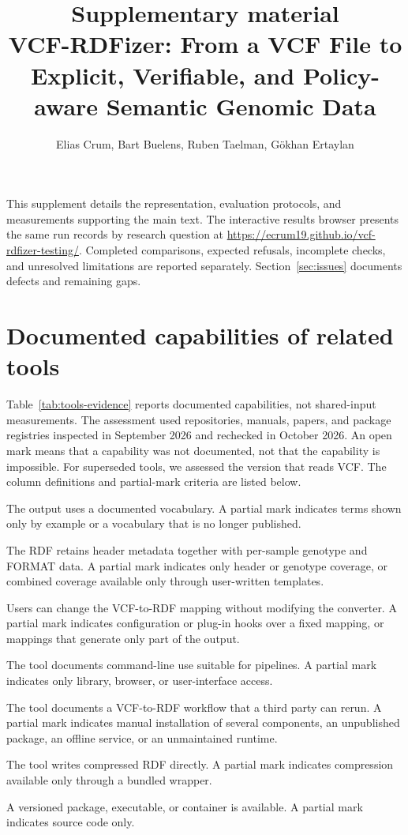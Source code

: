 \documentclass[11pt]{article}
\title{Supplementary material\\[4pt]\large VCF-RDFizer: From a VCF File to Explicit, Verifiable, and Policy-aware Semantic Genomic Data}
\author{Elias Crum, Bart Buelens, Ruben Taelman, G\"okhan Ertaylan}
\date{}
\begin{document}
\maketitle
\noindent This supplement details the representation, evaluation protocols, and measurements supporting the main text.
The interactive results browser presents the same run records by research question at \url{https://ecrum19.github.io/vcf-rdfizer-testing/}.
Completed comparisons, expected refusals, incomplete checks, and unresolved limitations are reported separately.
Section~\ref{sec:issues} documents defects and remaining gaps.
{\small\setlength{\parskip}{0pt}\tableofcontents}
\clearpage

\section{Documented capabilities of related tools}\label{sec:tools}
Table~\ref{tab:tools-evidence} reports documented capabilities, not shared-input measurements.
The assessment used repositories, manuals, papers, and package registries inspected in September 2026 and rechecked in October 2026.
An open mark means that a capability was not documented, not that the capability is impossible.
For superseded tools, we assessed the version that reads VCF.
The column definitions and partial-mark criteria are listed below.
\begin{description}\setlength{\itemsep}{1pt}
\item[RDF model] The output uses a documented vocabulary.
A partial mark indicates terms shown only by example or a vocabulary that is no longer published.
\item[Header + genotype] The RDF retains header metadata together with per-sample genotype and FORMAT data.
A partial mark indicates only header or genotype coverage, or combined coverage available only through user-written templates.
\item[Editable mappings] Users can change the VCF-to-RDF mapping without modifying the converter.
A partial mark indicates configuration or plug-in hooks over a fixed mapping, or mappings that generate only part of the output.
\item[CLI] The tool documents command-line use suitable for pipelines.
A partial mark indicates only library, browser, or user-interface access.
\item[Reproducible workflow] The tool documents a VCF-to-RDF workflow that a third party can rerun.
A partial mark indicates manual installation of several components, an unpublished package, an offline service, or an unmaintained runtime.
\item[Compressed RDF] The tool writes compressed RDF directly.
A partial mark indicates compression available only through a bundled wrapper.
\item[Public release] A versioned package, executable, or container is available.
A partial mark indicates source code only.
\end{description}
\end{document}
